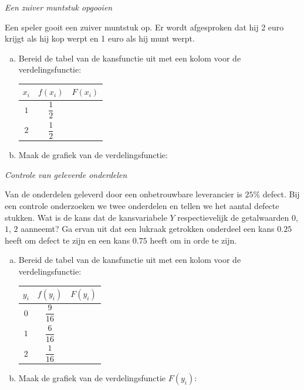 \documentclass[a4paper,12pt, twoside]{article}
\begin{document}
\begin{oefening} {\em Een zuiver muntstuk opgooien}

Een speler gooit een zuiver muntstuk op. Er wordt afgesproken dat hij 2 euro krijgt als hij kop werpt en 1 euro als hij munt werpt.

\begin{enumerate}[(a)]
  \itemsep1em
  \item Bereid de tabel van de kansfunctie uit met een kolom voor de verdelingsfunctie:
  \begin{center}
    \begin{tabular}{c|c|c}
      $x_i$ & $f(x_i)$ & $F(x_i)$\\
      \hline
      $1$ & $\dfrac{1}{2}$ &\\
      $2$ & $\dfrac{1}{2}$ &\\
    \end{tabular}
  \end{center}
  \item Maak de grafiek van de verdelingsfunctie:
  \begin{center}
  \end{center}
\end{enumerate}
\end{oefening}

\begin{oefening} {\em Controle van geleverde onderdelen}

Van de onderdelen geleverd door een onbetrouwbare leverancier is $25\%$ defect. Bij een controle onderzoeken we twee onderdelen en tellen we het aantal defecte stukken. Wat is de kans dat de kansvariabele $Y$ respectievelijk de getalwaarden $0$, $1$, $2$ aanneemt? Ga ervan uit dat een lukraak getrokken onderdeel een kans $0.25$ heeft om defect te zijn en een kans $0.75$ heeft om in orde te zijn.

\begin{enumerate}[(a)]
  \itemsep1em
  \item Bereid de tabel van de kansfunctie uit met een kolom voor de verdelingsfunctie:
  \begin{center}
    \begin{tabular}{c|c|c}
      $y_i$ & $f(y_i)$ & $F(y_i)$\\
      \hline
      $0$ & $\dfrac{9}{16}$ &\\
      $1$ & $\dfrac{6}{16}$ &\\
      $2$ & $\dfrac{1}{16}$ &\\
    \end{tabular}
  \end{center}
  \item Maak de grafiek van de verdelingsfunctie $F(y_i)$:
  \begin{center}
  \end{center}
\end{enumerate}
\end{oefening}
\end{document}
